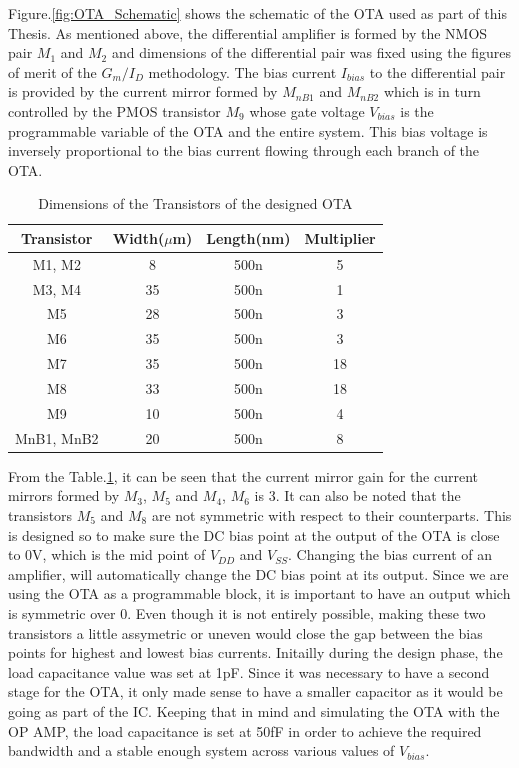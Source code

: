 Figure.\ref{fig:OTA_Schematic} \cite{lcmfb_ota} shows the schematic of the OTA used as part of this Thesis. As mentioned above, the differential amplifier is formed by the NMOS pair $M_{1}$ and $M_{2}$ and dimensions of the differential pair was fixed using the figures of merit of the ${G_m/I_D}$ methodology. The bias current $I_{bias}$ to the differential pair is provided by the current mirror formed by $M_{nB1}$ and $M_{nB2}$ which is in turn controlled by the PMOS transistor $M_9$ whose gate voltage $V_{bias}$ is the programmable variable of the OTA and the entire system. This bias voltage is inversely proportional to the bias current flowing through each branch of the OTA.

\begin{table} [H]
\centering
\begin{tabular}{@{}cccc@{}}
\toprule
Transistor			& Width($\mu$m)		& Length(nm)		& Multiplier \\ \midrule
M1, M2				& 8					& 500n				& 5			\\
M3, M4				& 35				& 500n				& 1			\\
M5					& 28				& 500n				& 3			\\
M6					& 35				& 500n				& 3			\\
M7					& 35				& 500n				& 18		\\
M8					& 33				& 500n				& 18		\\
M9					& 10				& 500n				& 4			\\
MnB1, MnB2			& 20				& 500n				& 8			\\
\bottomrule
\end{tabular}
\caption{Dimensions of the Transistors of the designed OTA}
\label{tab:OTA_dimensions}
\end{table}
From the Table.\ref{tab:OTA_dimensions}, it can be seen that the current mirror gain for the current mirrors formed by $M_{3}$, $M_{5}$ and $M_{4}$, $M_{6}$ is 3. It can also be noted that the transistors $M_{5}$ and $M_{8}$ are not symmetric with respect to their counterparts. This is designed so to make sure the DC bias point at the output of the OTA is close to 0V, which is the mid point of $V_{DD}$ and $V_{SS}$. Changing the bias current of an amplifier, will automatically change the DC bias point at its output. Since we are using the OTA as a programmable block, it is important to have an output which is symmetric over 0. Even though it is not entirely possible, making these two transistors a little assymetric or uneven would close the gap between the bias points for highest and lowest bias currents. Initailly during the design phase, the load capacitance value was set at 1pF. Since it was necessary to have a second stage for the OTA, it only made sense to have a smaller capacitor as it would be going as part of the IC. Keeping that in mind and simulating the OTA with the OP AMP, the load capacitance is set at 50fF in order to achieve the required bandwidth and a stable enough system across various values of $V_{bias}$.

